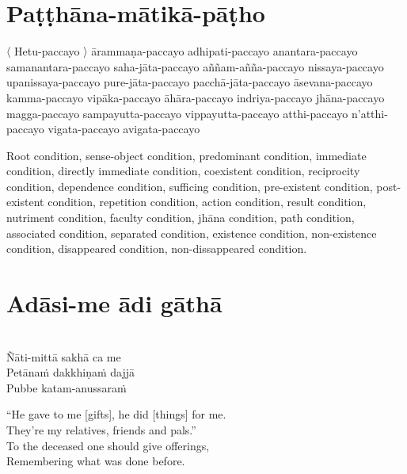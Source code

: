 \suttaRef{[SN 12.1]}

\section{Paṭṭhāna-mātikā-pāṭho}
\label{patthana-matika-patho}

\vspace{-0.8em}

\begin{pali-hang}
  〈 Hetu-paccayo 〉 ārammaṇa-paccayo adhipati-paccayo anantara-paccayo samanantara-paccayo saha-jāta-paccayo aññam-añña-paccayo nissaya-paccayo upanissaya-paccayo pure-jāta-paccayo pacchā-jāta-paccayo āsevana-paccayo kamma-paccayo vipāka-paccayo āhāra-paccayo indriya-paccayo jhāna-paccayo magga-paccayo sampayutta-paccayo vippayutta-paccayo atthi-paccayo n'atthi-paccayo vigata-paccayo avigata-paccayo
\end{pali-hang}

\begin{english-hang-verses}
  Root condition, sense-object condition, predominant condition, immediate condition, directly immediate condition, coexistent condition, reciprocity condition, dependence condition, sufficing condition, pre-existent condition, post-existent condition, repetition condition, action condition, result condition, nutriment condition, faculty condition, jhāna condition, path condition, associated condition, separated condition, existence condition, non-existence condition, disappeared condition, non-dissappeared condition.
\end{english-hang-verses}

\suttaRef{[Dhs A]}

\section{Adāsi-me ādi gāthā}
\label{adasi-me-adi-gatha}

\vspace{-0.8em}

\begin{pali-hang}
\\
Ñāti-mittā sakhā ca me\\
Petānaṁ dakkhiṇaṁ dajjā\\
Pubbe katam-anussaraṁ
\end{pali-hang}

\begin{english-verses}
  ``He gave to me [gifts], he did [things] for me.\\
  They're my relatives, friends and pals.''\\
  To the deceased one should give offerings,\\
  Remembering what was done before.
\end{english-verses}

